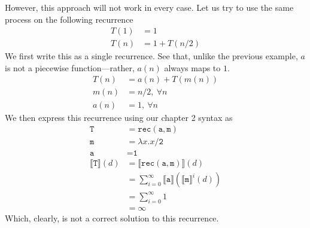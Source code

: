 However, this approach will not work in every case. Let us try to use the same process on the following recurrence
\begin{align*}
T(1) &= 1 \\
T(n) &= 1 + T(n/2) 
\end{align*}
We first write this as a single recurrence. See that, unlike the previous example, $a$ is not a piecewise function---rather,
$a(n)$ always maps to $1$.
\begin{align*}
T(n) &= a(n) + T(m(n)) \\
m(n) &= n/2, \ \forall n \\ 
a(n) &= 1, \ \forall n
\end{align*}
We then express this recurrence using our chapter 2 syntax as
\begin{align*}
\texttt{T} &= \texttt{rec}(\texttt{a},\texttt{m}) \\
\texttt{m} &= \lambda x.x/\texttt{2} \\
\texttt{a} &= \texttt{1} \\
\llbracket \texttt{T} \rrbracket(d) &= \llbracket \texttt{rec}(\texttt{a},\texttt{m}) \rrbracket(d) \\
&= \sum_{i=0}^{\infty}\llbracket \texttt{a} \rrbracket(\llbracket \texttt{m}\rrbracket^i(d)) \\
&= \sum_{i=0}^{\infty}1 \\
&= \infty
\end{align*}
Which, clearly, is not a correct solution to this recurrence.